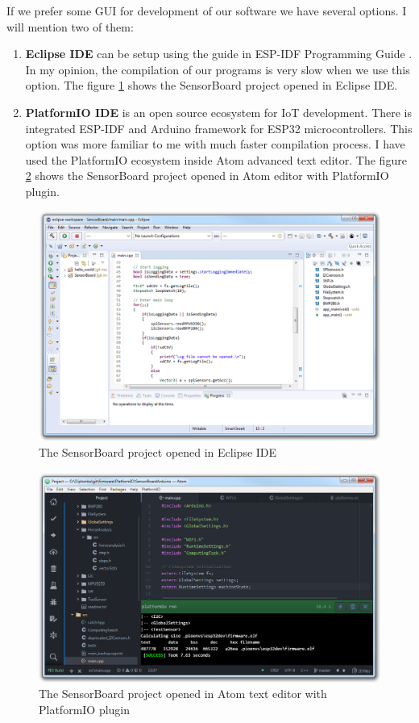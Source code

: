 If we prefer some GUI for development of our software we have several options. I will mention two of them:
\begin{enumerate}
	\item \textbf{Eclipse IDE} can be setup using the guide in ESP-IDF Programming Guide \cite{ESP32eclipse}. In my opinion, the compilation of our programs is very slow when we use this option. The figure \ref{ESP32eclipse} shows the SensorBoard project opened in Eclipse IDE.
	\item \textbf{PlatformIO IDE} is an open source ecosystem for IoT development. \cite{PlatformIO} There is integrated ESP-IDF and Arduino framework for ESP32 microcontrollers. This option was more familiar to me with much faster compilation process. I have used the PlatformIO ecosystem inside Atom \cite{AtomEditor} advanced text editor. The figure \ref{ESP32atom} shows the SensorBoard project opened in Atom editor with PlatformIO plugin.
\end{enumerate}

\begin{figure}
	\centering
	\label{ESP32eclipse}
	\caption{The SensorBoard project opened in Eclipse IDE}
	\includegraphics[width=16cm]{img/ESP32eclipse.png}
\end{figure}

\begin{figure}
	\centering
	\label{ESP32atom}
	\caption{The SensorBoard project opened in Atom text editor with PlatformIO plugin}
	\includegraphics[width=16cm]{img/ESP32atom.png}
\end{figure}

